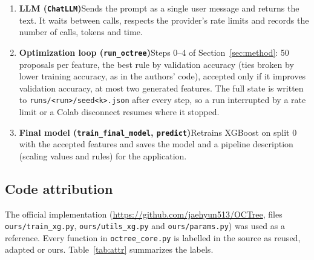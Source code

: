 \documentclass[11pt]{article}
\newcommand{\code}[1]{\texttt{#1}}
\begin{document}
\begin{enumerate}[label=\arabic*),leftmargin=*,itemsep=3pt]
  ablation.
\item \textbf{LLM (\code{ChatLLM})}\newline Sends the prompt as a single user message and returns the text. It waits
  between calls, respects the provider's rate limits and records the number of calls, tokens and
  time.
\item \textbf{Optimization loop (\code{run\_octree})}\newline Steps 0--4 of Section~\ref{sec:method}: 50 proposals
  per feature, the best rule by validation accuracy (ties broken by lower training accuracy, as in
  the authors' code), accepted only if it improves validation accuracy, at most two generated
  features. The full state is written to \code{runs/<run>/seed<k>.json} after every step, so a run
  interrupted by a rate limit or a Colab disconnect resumes where it stopped.
\item \textbf{Final model (\code{train\_final\_model}, \code{predict})}\newline Retrains XGBoost on split 0 with the
  accepted features and saves the model and a pipeline description (scaling values and rules) for
  the application.
\end{enumerate}

\subsection{Code attribution}
The official implementation (\url{https://github.com/jaehyun513/OCTree}, files
\code{ours/train\_xg.py}, \code{ours/utils\_xg.py} and \code{ours/params.py}) was used as a
reference. Every function in \code{octree\_core.py} is labelled in the source as reused, adapted or
ours. Table~\ref{tab:attr} summarizes the labels.
\end{document}
